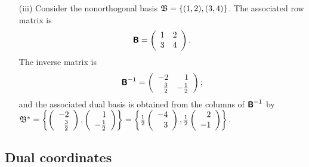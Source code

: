 {\begin{itemize}
\item[(iii)]
Consider the nonorthogonal basis
${\frak B} =
\{(1, 2), (3, 4)\}$.
The associated row matrix is
$$
\textsf{\textbf{B}}
=
\left(
\begin{array}{rrrr}
1&2\\
3&4
\end{array}
\right).
$$
The inverse matrix is
$$
\textsf{\textbf{B}}^{-1}
=
\left(
\begin{array}{rrrr}
-2&1\\
\frac{3}{2}&-\frac{1}{2}
\end{array}
\right);
$$
and the associated dual basis is obtained from the columns of $\textsf{\textbf{B}}^{-1} $ by
\label{2011-m-cenobdb}
${\frak B}^* =
\left\{\left(
\begin{array}{r}
-2\\ \frac{3}{2}
\end{array}\right),
\left(
\begin{array}{r}
1\\
-\frac{1}{2}
\end{array}
\right)
\right\} =
\left\{\frac{1}{2} \left(
\begin{array}{r}
-4\\ 3
\end{array}\right),
\frac{1}{2}
\left(
\begin{array}{r}
2\\
-1
\end{array}
\right)
\right\}
$.
\eexample
\end{itemize}
}


\subsection{Dual coordinates}

